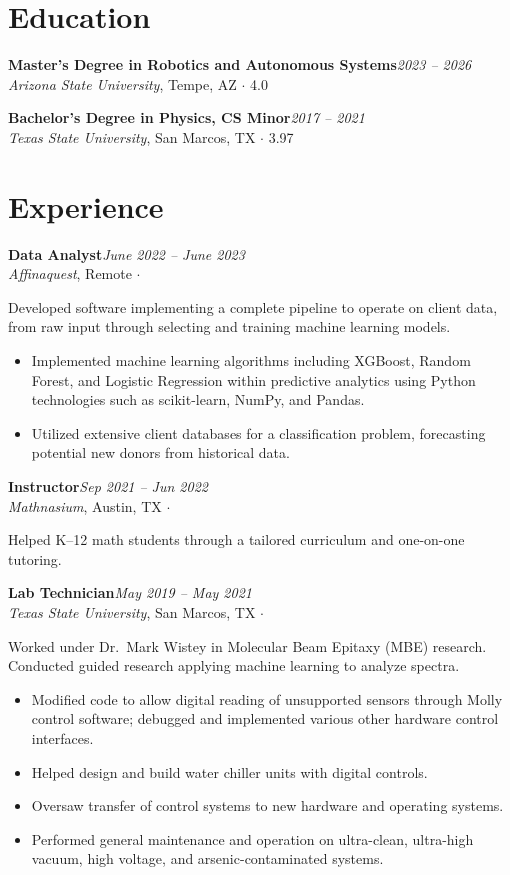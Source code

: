 \documentclass[10pt,letterpaper,sans]{moderncv}
\renewcommand*{\cventry}[6]{%
    {\bfseries #2}\hfill{\itshape #1}\\%
    {\itshape #3}, #4%
    \ifx\relax#5\relax\else{} $\cdot$ #5\fi\par\nopagebreak%
    #6\par\smallskip%
  }
\begin{document}
\makecvtitle
\vspace{-1em}

\section{Education}
  \cventry{2023 -- 2026}{Master's Degree in Robotics and Autonomous Systems}{Arizona State University}{Tempe, AZ}{4.0}{}
  \cventry{2017 -- 2021}{Bachelor's Degree in Physics, CS Minor}{Texas State University}{San Marcos, TX}{3.97}{}

\section{Experience}
  \cventry{June 2022 -- June 2023}{Data Analyst}{Affinaquest}{Remote}{}{%
    Developed software implementing a complete pipeline to operate on client data, from raw input through
    selecting and training machine learning models.
    \begin{itemize}
      \item Implemented machine learning algorithms including XGBoost, Random Forest, and Logistic Regression
            within predictive analytics using Python technologies such as scikit-learn, NumPy, and Pandas.
      \item Utilized extensive client databases for a classification problem, forecasting potential new donors
            from historical data.
    \end{itemize}%
  }

  \cventry{Sep 2021 -- Jun 2022}{Instructor}{Mathnasium}{Austin, TX}{}{%
    Helped K--12 math students through a tailored curriculum and one-on-one tutoring.%
  }

  \cventry{May 2019 -- May 2021}{Lab Technician}{Texas State University}{San Marcos, TX}{}{%
    Worked under Dr.\ Mark Wistey in Molecular Beam Epitaxy (MBE) research.
    Conducted guided research applying machine learning to analyze spectra.
    \begin{itemize}
      \item Modified code to allow digital reading of unsupported sensors through Molly control software;
            debugged and implemented various other hardware control interfaces.
      \item Helped design and build water chiller units with digital controls.
      \item Oversaw transfer of control systems to new hardware and operating systems.
      \item Performed general maintenance and operation on ultra-clean, ultra-high vacuum, high voltage,
            and arsenic-contaminated systems.
    \end{itemize}%
  }
\end{document}
